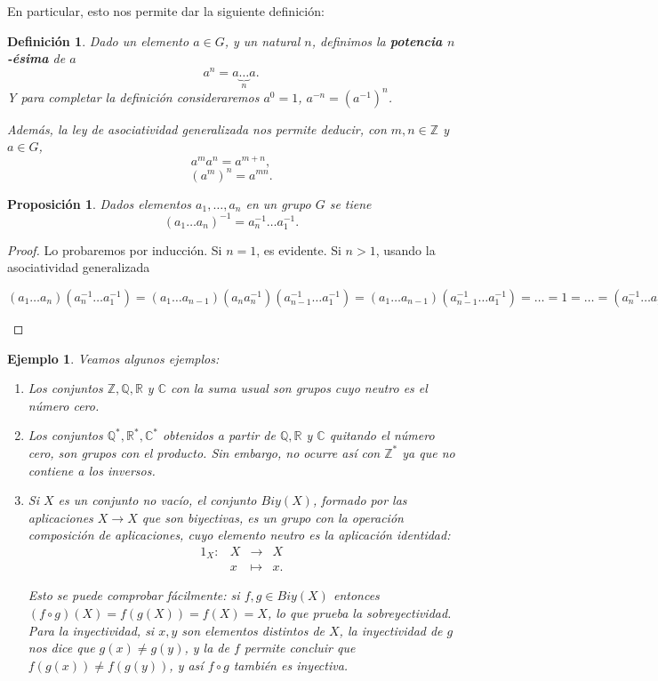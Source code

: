 \documentclass[12pt]{article}
\newtheorem{proposition}[theorem]{Proposición}
\newtheorem{definition}[theorem]{Definición}
\newtheorem{example}{Ejemplo}[theorem]
\begin{document}
En particular, esto nos permite dar la siguiente definición: 

\begin{definition}Dado un elemento $a\in G$, y un natural $n$, definimos la \textbf{potencia $n$-ésima} de $a$ $$a^n = a \underbrace{\ldots}_n a.$$ Y para completar la definición consideraremos $a^0 =1$, $a^{-n} = (a^{-1})^n$.

Además, la ley de asociatividad generalizada nos permite deducir, con $m,n \in \mathbb{Z}$ y $a\in G$, $$a^ma^n = a^{m+n},$$ $$(a^m)^n = a^{mn}.$$
\end{definition}

\begin{proposition}Dados elementos $a_1, \ldots, a_n$ en un grupo $G$ se tiene $$(a_1 \ldots a_n)^{-1} = a_n^{-1} \ldots a_1^{-1}.$$
\end{proposition}
\begin{proof}
Lo probaremos por inducción. Si $n = 1$, es evidente. Si $n>1$, usando la asociatividad generalizada \begin{center}$(a_1\ldots a_n)(a_n^{-1} \ldots a_1^{-1}) = (a_1\ldots a_{n-1})(a_na_n^{-1})(a_{n-1}^{-1} \ldots a_1^{-1}) = (a_1\ldots a_{n-1})(a_{n-1}^{-1} \ldots a_1^{-1}) = \ldots = 1 = \ldots = (a_n^{-1} \ldots a_2^{-1}) (a_2\ldots a_n) =(a_n^{-1} \ldots a_2^{-1})(a_1^{-1}a_1)(a_2\ldots a_n) = (a_n^{-1} \ldots a_1^{-1})(a_1\ldots a_n)$\end{center}

\end{proof}

\begin{example}\label{ex:exPri} Veamos algunos ejemplos:
\begin{enumerate}
\item Los conjuntos $\mathbb{Z}, \mathbb{Q}, \mathbb{R}$ y $\mathbb{C}$ con la suma usual son grupos cuyo neutro es el número cero.
\item Los conjuntos $\mathbb{Q}^\ast, \mathbb{R}^\ast, \mathbb{C}^\ast$ obtenidos a partir de $\mathbb{Q}, \mathbb{R}$ y $\mathbb{C}$ quitando el número cero, son grupos con el producto. Sin embargo, no ocurre así con $\mathbb{Z}^\ast$ ya que no contiene a los inversos.
\item Si $X$ es un conjunto no vacío, el conjunto $Biy(X)$, formado por las aplicaciones $X \longrightarrow X$ que son biyectivas, es un grupo con la operación composición de aplicaciones, cuyo elemento neutro es la aplicación identidad: 
$$\begin{array}{rccl}
1_X \colon &X & \longrightarrow & X\\
&x & \longmapsto &x.
\end{array}
$$

Esto se puede comprobar fácilmente: si $f,g \in Biy(X)$ entonces $(f \circ g)(X) = f(g(X)) = f(X) = X$, lo que prueba la sobreyectividad. Para la inyectividad, si $x,y$ son elementos distintos de $X$, la inyectividad de $g$ nos dice que $g(x) \neq g(y)$, y la de $f$ permite concluir que $f(g(x)) \neq f(g(y))$, y así $f \circ g$ también es inyectiva.
\end{enumerate}
\end{example}
\end{document}
